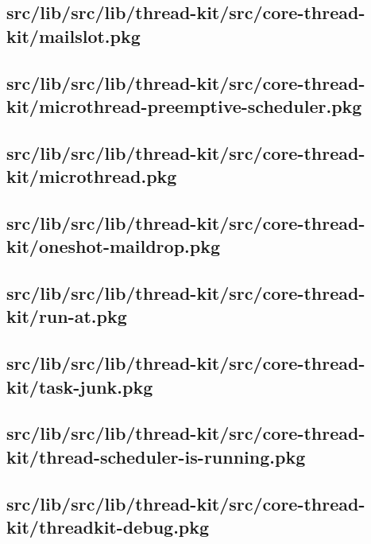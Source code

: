 \subsection{src/lib/src/lib/thread-kit/src/core-thread-kit/mailslot.pkg}


\subsection{src/lib/src/lib/thread-kit/src/core-thread-kit/microthread-preemptive-scheduler.pkg}


\subsection{src/lib/src/lib/thread-kit/src/core-thread-kit/microthread.pkg}


\subsection{src/lib/src/lib/thread-kit/src/core-thread-kit/oneshot-maildrop.pkg}


\subsection{src/lib/src/lib/thread-kit/src/core-thread-kit/run-at.pkg}


\subsection{src/lib/src/lib/thread-kit/src/core-thread-kit/task-junk.pkg}


\subsection{src/lib/src/lib/thread-kit/src/core-thread-kit/thread-scheduler-is-running.pkg}


\subsection{src/lib/src/lib/thread-kit/src/core-thread-kit/threadkit-debug.pkg}



